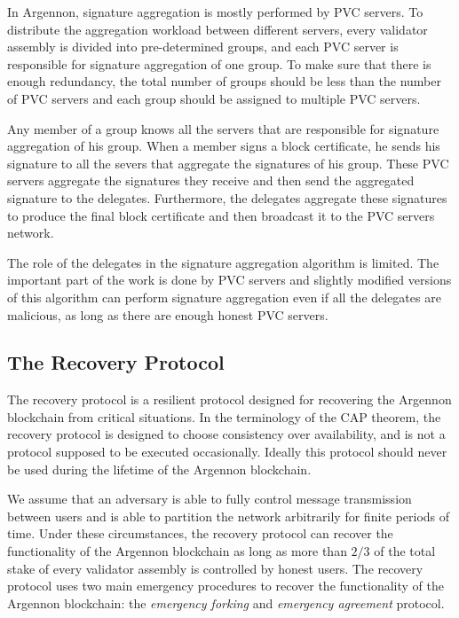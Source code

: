 In Argennon, signature aggregation is mostly performed by PVC servers. To distribute the aggregation workload
between different servers, every validator assembly is divided into pre-determined groups, and each PVC
server is responsible for signature aggregation of one group. To make sure that there is enough redundancy, the
total number of groups should be less than the number of PVC servers and each group should be assigned to
multiple PVC servers.

Any member of a group knows all the servers that are responsible for signature aggregation of his group. When a member
signs a block certificate, he sends his signature to all the severs that aggregate the signatures of his group.
These PVC servers aggregate the signatures they receive and then send the aggregated signature to the delegates.
Furthermore, the delegates aggregate these signatures to produce the final block certificate
and then broadcast it to the PVC servers network.

The role of the delegates in the signature aggregation algorithm is limited. The important part of the work is done by
PVC servers and slightly modified versions of this algorithm can perform signature aggregation
even if all the delegates are malicious, as long as there are enough honest PVC servers.

\subsection{The Recovery Protocol}\label{subsec:recovery}

The recovery protocol is a resilient protocol designed for recovering the Argennon blockchain from critical situations.
In the terminology of the CAP theorem, the recovery protocol is designed to choose consistency over availability,
and is not a protocol supposed to be executed occasionally. Ideally this protocol should never be used
during the lifetime of the Argennon blockchain.

We assume that an adversary is able to fully control message transmission between users and is able to partition the
network arbitrarily for finite periods of time. Under these circumstances, the recovery protocol can recover the
functionality of the Argennon blockchain as long as more than $2/3$ of the total stake of every validator assembly is
controlled by honest users. The recovery protocol uses two main emergency procedures to
recover the functionality of the Argennon blockchain: the \emph{emergency forking} and \emph{emergency
agreement} protocol.

